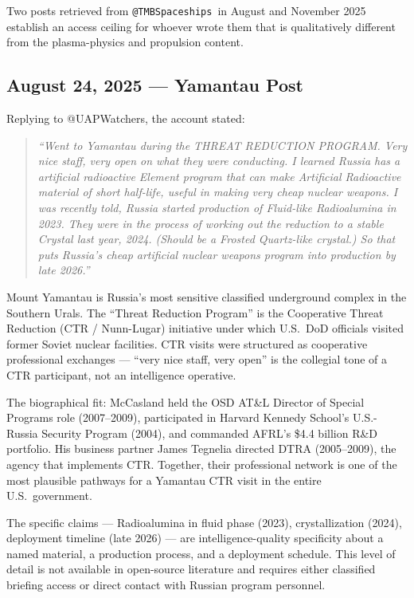 \documentclass[11pt]{article}
\makeatletter
\newcommand{\account}{\texttt{@TMBSpaceships}}
\makeatother
\begin{document}
Two posts retrieved from \account\ in August and November 2025 establish an access ceiling for whoever wrote them that is qualitatively different from the plasma-physics and propulsion content.

\subsection{August 24, 2025 — Yamantau Post}

Replying to @UAPWatchers, the account stated:

\begin{quote}
\emph{``Went to Yamantau during the THREAT REDUCTION PROGRAM. Very nice staff, very open on what they were conducting. I learned Russia has a artificial radioactive Element program that can make Artificial Radioactive material of short half-life, useful in making very cheap nuclear weapons. I was recently told, Russia started production of Fluid-like Radioalumina in 2023. They were in the process of working out the reduction to a stable Crystal last year, 2024. (Should be a Frosted Quartz-like crystal.) So that puts Russia's cheap artificial nuclear weapons program into production by late 2026.''}
\end{quote}

Mount Yamantau is Russia's most sensitive classified underground complex in the Southern Urals. The ``Threat Reduction Program'' is the Cooperative Threat Reduction (CTR / Nunn-Lugar) initiative under which U.S.\ DoD officials visited former Soviet nuclear facilities. CTR visits were structured as cooperative professional exchanges — ``very nice staff, very open'' is the collegial tone of a CTR participant, not an intelligence operative.

The biographical fit: McCasland held the OSD AT\&L Director of Special Programs role (2007--2009), participated in Harvard Kennedy School's U.S.-Russia Security Program (2004), and commanded AFRL's \$4.4 billion R\&D portfolio. His business partner James Tegnelia directed DTRA (2005--2009), the agency that implements CTR. Together, their professional network is one of the most plausible pathways for a Yamantau CTR visit in the entire U.S.\ government.

The specific claims — Radioalumina in fluid phase (2023), crystallization (2024), deployment timeline (late 2026) — are intelligence-quality specificity about a named material, a production process, and a deployment schedule. This level of detail is not available in open-source literature and requires either classified briefing access or direct contact with Russian program personnel.
\end{document}

